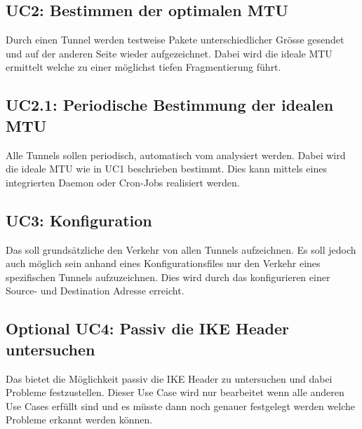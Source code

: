 \subsection{UC2: Bestimmen der optimalen MTU}
Durch einen Tunnel werden testweise Pakete unterschiedlicher Grösse gesendet und auf der anderen Seite wieder aufgezeichnet. Dabei wird die ideale MTU ermittelt welche zu einer möglichst tiefen Fragmentierung führt.

\subsection{UC2.1: Periodische Bestimmung der idealen MTU}
Alle Tunnels sollen periodisch, automatisch vom \tool analysiert werden. Dabei wird die ideale MTU wie in UC1 beschrieben bestimmt. Dies kann mittels eines integrierten Daemon oder Cron-Jobs realisiert werden.

\subsection{UC3: Konfiguration}
Das \tool soll grundsätzliche den Verkehr von allen Tunnels aufzeichnen. Es soll jedoch auch möglich sein anhand eines Konfigurationsfiles nur den Verkehr eines spezifischen Tunnels aufzuzeichnen. Dies wird durch das konfigurieren einer Source- und Destination Adresse erreicht.

\subsection{Optional UC4: Passiv die IKE Header untersuchen}
Das \tool bietet die Möglichkeit passiv die IKE Header zu untersuchen und dabei Probleme festzustellen. Dieser Use Case wird nur bearbeitet wenn alle anderen Use Cases erfüllt sind und es müsste dann noch genauer festgelegt werden welche Probleme erkannt werden können.